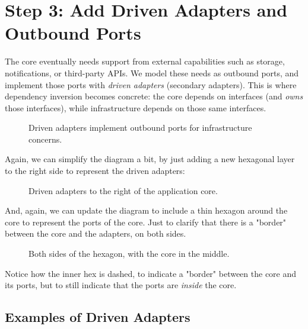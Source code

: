 \section{Step 3: Add Driven Adapters and Outbound Ports}
\label{sec:hexagonal_step3}

The core eventually needs support from external capabilities such as storage, notifications, or third-party APIs. We model these needs as outbound ports, and implement those ports with \textit{driven adapters} (secondary adapters). This is where dependency inversion becomes concrete: the core depends on interfaces (and \textit{owns} those interfaces), while infrastructure depends on those same interfaces.\autocite{fowler2002patterns}

\begin{figure}[htbp]
    \centering
    
    \caption{Driven adapters implement outbound ports for infrastructure concerns.}
    \label{fig:hexagonal_driven_adapters}
\end{figure}

Again, we can simplify the diagram a bit, by just adding a new hexagonal layer to the right side to represent the driven adapters:

\begin{figure}[htbp]
    \centering
    
    \caption{Driven adapters to the right of the application core.}
    \label{fig:hexagonal_driven_adapters_simplified}
\end{figure}

And, again, we can update the diagram to include a thin hexagon around the core to represent the ports of the core. Just to clarify that there is a "border" between the core and the adapters, on both sides.

\begin{figure}[htbp]
    \centering
    
    \caption{Both sides of the hexagon, with the core in the middle.}
    \label{fig:hexagonal_both_sides_simplified}
\end{figure}

Notice how the inner hex is dashed, to indicate a "border" between the core and its ports, but to still indicate that the ports are \textit{inside} the core.

\subsection{Examples of Driven Adapters}
\label{sec:hexagonal_driven_examples}

